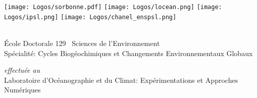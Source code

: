 

\NewDocumentCommand {}

\begin{titlingpage}

\begin{center}
  \def\logosheight{3.2em}
  \texttt{[image: Logos/sorbonne.pdf]}
  \hfill
  \texttt{[image: Logos/locean.png]}
  \hfill
  \texttt{[image: Logos/ipsl.png]}
  \hfill
  \texttt{[image: Logos/chanel\_enspsl.png]}

  \vspace{4.5ex}

  \\
  \vspace{3ex}
  {\normalsize École Doctorale 129 \textendash\ Sciences de l'Environnement\\
  Spécialité: Cycles Biogéochimiques et Changements Environnementaux Globaux}

  \vspace{2ex}

  {\small\textit{effectuée au}}\\
  {\normalsize Laboratoire d'Océanographie et du Climat: Expérimentations et Approches Numériques}


  \parbox{0.9\textwidth}{
    {
      \centering\parskip=0pt
      \xhrulefill[thickness=2pt, height=-0.6ex]\par
    }
  }




\end{center}
\end{titlingpage}
